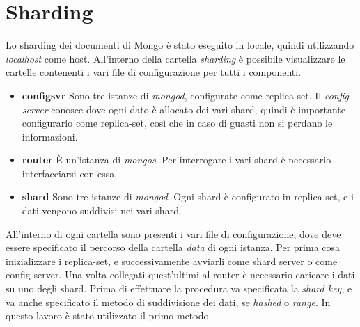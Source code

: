 \documentclass[10pt, a4paper,openany]{article}
\begin{document}
\section*{Sharding}

Lo sharding dei documenti di Mongo è stato eseguito in locale, quindi utilizzando \textit{localhost} come host. All'interno della cartella \textit{sharding} è possibile visualizzare le cartelle contenenti i vari file di configurazione per tutti i componenti.

\begin{itemize}
	\item \textbf{configsvr} Sono tre istanze di \textit{mongod}, configurate come replica set. Il \textit{config server} conosce dove ogni dato è allocato dei vari shard, quindi è importante configurarlo come replica-set, così che in caso di guasti non si perdano le informazioni.
	\item \textbf{router} \`E un'istanza di \textit{mongos}. Per interrogare i vari shard è necessario interfacciarsi con essa.
	\item \textbf{shard} Sono tre istanze di \textit{mongod}. Ogni shard è configurato in replica-set, e i dati vengono suddivisi nei vari shard.
\end{itemize}

All'interno di ogni cartella sono presenti i vari file di configurazione, dove deve essere specificato il percorso della cartella \textit{data} di ogni istanza. Per prima cosa inizializzare i replica-set, e successivamente avviarli come shard server o come config server. Una volta collegati quest'ultimi al router è necessario caricare i dati su uno degli shard. Prima di effettuare la procedura va specificata la \textit{shard key}, e va anche specificato il metodo di suddivisione dei dati, se \textit{hashed} o \textit{range}. In questo lavoro è stato utilizzato il primo metodo.
\end{document}
